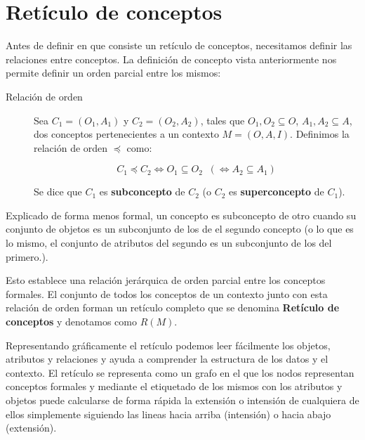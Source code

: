 	
\section*{Retículo de conceptos}	

	Antes de definir en que consiste un retículo de conceptos, necesitamos definir las relaciones entre conceptos. La definición de concepto vista anteriormente nos permite definir un orden parcial entre los mismos:
	
	\begin{description}
		\item[Relación de orden] Sea $C_1 = (O_1, A_1)$ y $ C_2 = (O_2, A_2)$, tales que $O_1, O_2 \subseteq O$, $A_1, A_2 \subseteq A$, dos conceptos pertenecientes a un contexto $M = (O,A,I)$. Definimos la relación de orden $ \preceq $ como:
		
		\[ C_1 \preceq C_2 \Longleftrightarrow O_1 \subseteq O_2 \;\; (\Leftrightarrow A_2 \subseteq A_1 ) \]
	
		Se dice que $C_1$ es \textbf{subconcepto} de $C_2$ (o $C_2$ es \textbf{superconcepto} de $C_1$).
	\end{description} 

	 Explicado de forma menos formal, un concepto es subconcepto de otro cuando su conjunto de objetos es un subconjunto de los de el segundo concepto (o lo que es lo mismo, el conjunto de atributos del segundo es un subconjunto de los del primero.). 
	
	Esto establece una relación jerárquica de orden parcial entre los conceptos formales. El conjunto de todos los conceptos de un contexto junto con esta relación de orden forman un retículo completo que se denomina \textbf{Retículo de conceptos} y denotamos como $R(M)$.


	
	Representando gráficamente el retículo podemos leer fácilmente los objetos, atributos y relaciones y ayuda a comprender la estructura de los datos y el contexto. El retículo se representa como un grafo en el que los nodos representan conceptos formales y mediante el etiquetado de los mismos con los atributos y objetos puede calcularse de forma rápida la extensión o intensión de cualquiera de ellos simplemente siguiendo las lineas hacia arriba (intensión) o hacia abajo (extensión).
	

